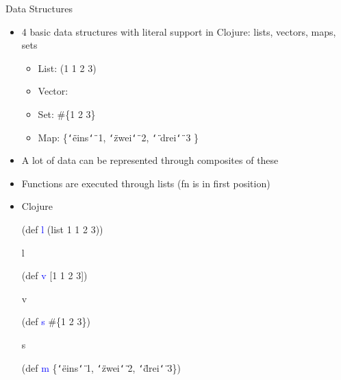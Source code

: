 \documentclass{beamer}
\renewcommand{\textquotedbl}{\texttt{\char`\"}}
\begin{document}
\begin{frame}[allowframebreaks]{Data Structures}
  \begin{itemize}
  \item 4 basic data structures with literal support in Clojure: lists, vectors,
    maps, sets
    \begin{itemize}
    \item List: {\ttfamily(1 1 2 3)}
    \item Vector: {\ttfamily[1 1 2 3]}
    \item Set: {\ttfamily \#\{1 2 3\}}
    \item Map: {\ttfamily \{\textquotedbl eins\textquotedbl\  1,
      \textquotedbl zwei\textquotedbl\ 2, \textquotedbl
      drei\textquotedbl\ 3 \}}
    \end{itemize}
  \item A lot of data can be represented through composites of these
  \item Functions are executed through lists (fn is in first position)

    \framebreak
  \item Clojure\\
\begin{small}
{\ttfamily\color{black}
%
\textcolor[rgb]{0.54901963,0.54901963,0.54901963}{(}\textcolor[rgb]{0.49803922,0.0,0.49803922}{def}
\textcolor{blue}{l}
\textcolor[rgb]{0.54901963,0.54901963,0.54901963}{(}\textcolor[rgb]{0.28235295,0.23921569,0.54509807}{list}
1 1 2 3\textcolor[rgb]{0.54901963,0.54901963,0.54901963}{))}}

{\ttfamily\color{black}
l}

{\ttfamily\color{black}
\textcolor[rgb]{0.54901963,0.54901963,0.54901963}{(}\textcolor[rgb]{0.49803922,0.0,0.49803922}{def}
\textcolor{blue}{v} [1 1 2
3]\textcolor[rgb]{0.54901963,0.54901963,0.54901963}{)}}

{\ttfamily\color{black}
v}

{\ttfamily\color{black}
\textcolor[rgb]{0.54901963,0.54901963,0.54901963}{(}\textcolor[rgb]{0.49803922,0.0,0.49803922}{def}
\textcolor{blue}{s} \#\{1 2
3\}\textcolor[rgb]{0.54901963,0.54901963,0.54901963}{)}}

{\ttfamily\color{black}
s}

{\ttfamily\color{black}
\textcolor[rgb]{0.54901963,0.54901963,0.54901963}{(}\textcolor[rgb]{0.49803922,0.0,0.49803922}{def}
\textcolor{blue}{m}
\{\textcolor[rgb]{0.54509807,0.13333334,0.32156864}{{\textquotedbl}eins{\textquotedbl}}
1,
\textcolor[rgb]{0.54509807,0.13333334,0.32156864}{{\textquotedbl}zwei{\textquotedbl}}
2,
\textcolor[rgb]{0.54509807,0.13333334,0.32156864}{{\textquotedbl}drei{\textquotedbl}}
3\}\textcolor[rgb]{0.54901963,0.54901963,0.54901963}{)}}


\end{small}
\end{itemize}
\end{frame}
\end{document}
